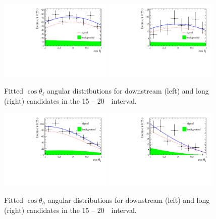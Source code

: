 \begin{figure}[t]
\centering
\includegraphics[width=0.48\textwidth]{Lmumu/figs/AngularDistribs/Fitted/Afb_DD_q2_1500_2000.pdf}
\includegraphics[width=0.48\textwidth]{Lmumu/figs/AngularDistribs/Fitted/Afb_LL_q2_1500_2000.pdf}
\caption{Fitted $\cos\theta_\ell$ angular distributions for downstream
 (left) and long (right) candidates in the 15 -- 20~\gevgevcccc ~\qsq interval.  }
\label{fig:AngFit}
\end{figure}
%
\begin{figure}[h]
\centering
\includegraphics[width=0.48\textwidth]{Lmumu/figs/AngularDistribs/Fitted/AfbB_DD_q2_1500_2000.pdf}
\includegraphics[width=0.48\textwidth]{Lmumu/figs/AngularDistribs/Fitted/AfbB_LL_q2_1500_2000.pdf}
\caption{Fitted $\cos\theta_h$ angular distributions for downstream
 (left) and long (right) candidates in the 15 -- 20~\gevgevcccc ~\qsq interval.  }
 \label{fig:AngFitB}
\end{figure}
